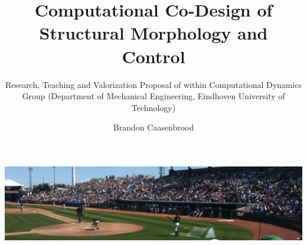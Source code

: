 \documentclass[acmtog]{acmart}
\begin{document}
\title{Computational Co-Design of Structural Morphology and Control}
\subtitle{Research, Teaching and Valorization Proposal of within Computational Dynamics Group  (Department of Mechanical Engineering, Eindhoven University of Technology)}

\author{Brandon Caasenbrood}
\authornote{}
\authornotemark[1]

\renewcommand{\shortauthors}{Trovato et al.}

\begin{abstract}

\end{abstract}


\begin{teaserfigure}
  \includegraphics[width=\textwidth]{sampleteaser}
  \caption{}
  \label{fig:teaser}
\end{teaserfigure}


\maketitle


\end{document}
